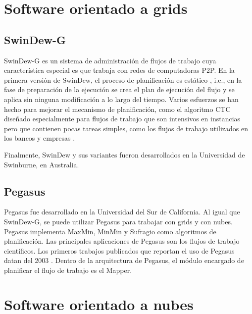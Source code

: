 \section{Software orientado a grids}

\subsection{SwinDew-G}


SwinDew-G \cite{yang2007peer} es un sistema de administración de flujos de trabajo cuya característica especial es que trabaja con redes de computadoras P2P. En la primera versión de SwinDew, el proceso de planificación es estático \cite{yang2007peer}, i.e., en la fase de preparación de la ejecución se crea el plan de ejecución del flujo y se aplica sin ninguna modificación a lo largo del tiempo. Varios esfuerzos se han hecho para mejorar el mecanismo de planificación, como el algoritmo CTC \cite{liu2010compromised} diseñado especialmente para flujos de trabajo que son intensivos en instancias pero que contienen pocas tareas simples, como los flujos de trabajo utilizados en los bancos y empresas \cite{liu2011novel}.

Finalmente, SwinDew y sus variantes fueron desarrollados en la Universidad de Swinburne, en Australia.

\subsection{Pegasus}

Pegasus \cite{deelman2005pegasus} fue desarrollado en la Universidad del Sur de California. Al igual que SwinDew-G, se puede utilizar Pegasus para trabajar con grids y con nubes. Pegasus implementa MaxMin, MinMin y Sufragio como algoritmos de planificación. Las principales aplicaciones de Pegasus son los flujos de trabajo científicos. Los primeros trabajos publicados que reportan el uso de Pegasus datan del 2003 \cite{pegasus2014publications}. Dentro de la arquitectura de Pegasus, el módulo encargado de planificar el flujo de trabajo es el Mapper.

\section{Software orientado a nubes}

